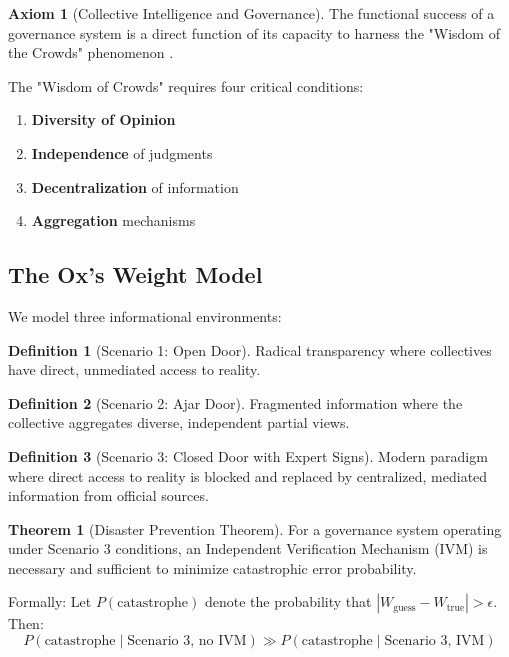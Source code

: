 \documentclass[11pt,a4paper]{article}
\theoremstyle{definition}
\newtheorem{definition}{Definition}[section]
\newtheorem{theorem}{Theorem}[section]
\newtheorem{axiom}{Axiom}[section]
\theoremstyle{remark}
\begin{document}
\begin{small}
\begin{axiom}[Collective Intelligence and Governance]
The functional success of a governance system is a direct function of its capacity to harness the "Wisdom of the Crowds" phenomenon \citep{surowiecki2004wisdom}.
\end{axiom}

The "Wisdom of Crowds" requires four critical conditions:
\begin{enumerate}
\item \textbf{Diversity of Opinion}
\item \textbf{Independence} of judgments
\item \textbf{Decentralization} of information
\item \textbf{Aggregation} mechanisms
\end{enumerate}

\subsection{The Ox's Weight Model}

We model three informational environments:

\begin{definition}[Scenario 1: Open Door]
Radical transparency where collectives have direct, unmediated access to reality.
\end{definition}

\begin{definition}[Scenario 2: Ajar Door]
Fragmented information where the collective aggregates diverse, independent partial views.
\end{definition}

\begin{definition}[Scenario 3: Closed Door with Expert Signs]
Modern paradigm where direct access to reality is blocked and replaced by centralized, mediated information from official sources.
\end{definition}

\begin{theorem}[Disaster Prevention Theorem]
For a governance system operating under Scenario 3 conditions, an Independent Verification Mechanism (IVM) is necessary and sufficient to minimize catastrophic error probability.

Formally: Let $P(\text{catastrophe})$ denote the probability that $|W_{\text{guess}} - W_{\text{true}}| > \epsilon$. Then:
\begin{equation}
P(\text{catastrophe} \mid \text{Scenario 3, no IVM}) \gg P(\text{catastrophe} \mid \text{Scenario 3, IVM})
\end{equation}
\end{theorem}


\end{small}
\end{document}
